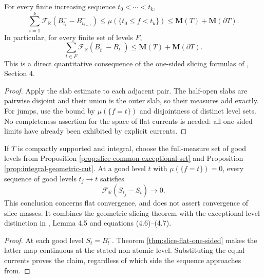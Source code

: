 \begin{proposition}\label{prop:slice-flat-total-variation}
For every finite increasing sequence $t_0<\cdots<t_k$,
\[
 \sum_{i=1}^k\mathcal F_{\mathbb R}(B_{t_i}^- -B_{t_{i-1}}^-)
 \leq\mu(\{t_0\leq f<t_k\})
 \leq\mathbf M(T)+\mathbf M(\partial T).
\]
In particular, for every finite set of levels $F$,
\[
 \sum_{t\in F}\mathcal F_{\mathbb R}(B_t^+-B_t^-)
 \leq\mathbf M(T)+\mathbf M(\partial T).
\]
This is a direct quantitative consequence of the one-sided slicing formulas of \cite{Sim18}, Section 4.
\end{proposition}
\begin{proof}
Apply the slab estimate to each adjacent pair. The half-open slabs are pairwise disjoint and their union is the outer slab, so their measures add exactly. For jumps, use the bound by $\mu(\{f=t\})$ and disjointness of distinct level sets. No completeness assertion for the space of flat currents is needed: all one-sided limits have already been exhibited by explicit currents.
\end{proof}

\begin{corollary}\label{cor:geometric-slice-flat-continuity}
If $T$ is compactly supported and integral, choose the full-measure set of good levels from Proposition \ref{prop:slice-common-exceptional-set} and Proposition \ref{prop:integral-geometric-cut}. At a good level $t$ with $\mu(\{f=t\})=0$, every sequence of good levels $t_j\to t$ satisfies
\[
 \mathcal F_{\mathbb R}(S_{t_j}-S_t)\longrightarrow0.
\]
This conclusion concerns flat convergence, and does not assert convergence of slice masses. It combines the geometric slicing theorem with the exceptional-level distinction in \cite{Sim18}, Lemma 4.5 and equations (4.6)--(4.7).
\end{corollary}
\begin{proof}
At each good level $S_t=B_t^-$. Theorem \ref{thm:slice-flat-one-sided} makes the latter map continuous at the stated non-atomic level. Substituting the equal currents proves the claim, regardless of which side the sequence approaches from.
\end{proof}
